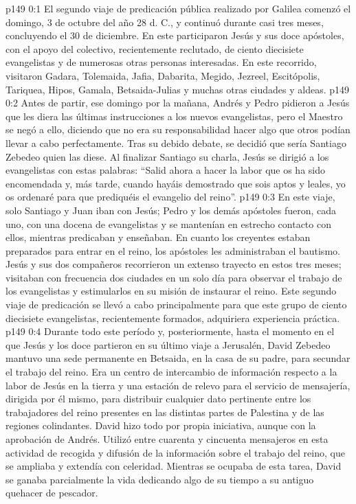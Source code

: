 \author{Comisión de seres intermedios}
\vs p149 0:1 El segundo viaje de predicación pública realizado por Galilea comenzó el domingo, 3 de octubre del año 28 d. C., y continuó durante casi tres meses, concluyendo el 30 de diciembre. En este participaron Jesús y sus doce apóstoles, con el apoyo del colectivo, recientemente reclutado, de ciento diecisiete evangelistas y de numerosas otras personas interesadas. En este recorrido, visitaron Gadara, Tolemaida, Jafia, Dabarita, Megido, Jezreel, Escitópolis, Tariquea, Hipos, Gamala, Betsaida\hyp{}Julias y muchas otras ciudades y aldeas.
\vs p149 0:2 Antes de partir, ese domingo por la mañana, Andrés y Pedro pidieron a Jesús que les diera las últimas instrucciones a los nuevos evangelistas, pero el Maestro se negó a ello, diciendo que no era su responsabilidad hacer algo que otros podían llevar a cabo perfectamente. Tras su debido debate, se decidió que sería Santiago Zebedeo quien las diese. Al finalizar Santiago su charla, Jesús se dirigió a los evangelistas con estas palabras: “Salid ahora a hacer la labor que os ha sido encomendada y, más tarde, cuando hayáis demostrado que sois aptos y leales, yo os ordenaré para que prediquéis el evangelio del reino”.
\vs p149 0:3 En este viaje, solo Santiago y Juan iban con Jesús; Pedro y los demás apóstoles fueron, cada uno, con una docena de evangelistas y se mantenían en estrecho contacto con ellos, mientras predicaban y enseñaban. En cuanto los creyentes estaban preparados para entrar en el reino, los apóstoles les administraban el bautismo. Jesús y sus dos compañeros recorrieron un extenso trayecto en estos tres meses; visitaban con frecuencia dos ciudades en un solo día para observar el trabajo de los evangelistas y estimularlos en su misión de instaurar el reino. Este segundo viaje de predicación se llevó a cabo principalmente para que este grupo de ciento diecisiete evangelistas, recientemente formados, adquiriera experiencia práctica.
\vs p149 0:4 \pc Durante todo este período y, posteriormente, hasta el momento en el que Jesús y los doce partieron en su último viaje a Jerusalén, David Zebedeo mantuvo una sede permanente en Betsaida, en la casa de su padre, para secundar el trabajo del reino. Era un centro de intercambio de información respecto a la labor de Jesús en la tierra y una estación de relevo para el servicio de mensajería, dirigida por él mismo, para distribuir cualquier dato pertinente entre los trabajadores del reino presentes en las distintas partes de Palestina y de las regiones colindantes. David hizo todo por propia iniciativa, aunque con la aprobación de Andrés. Utilizó entre cuarenta y cincuenta mensajeros en esta actividad de recogida y difusión de la información sobre el trabajo del reino, que se ampliaba y extendía con celeridad. Mientras se ocupaba de esta tarea, David se ganaba parcialmente la vida dedicando algo de su tiempo a su antiguo quehacer de pescador.
